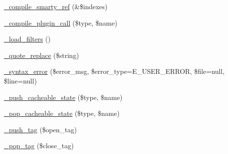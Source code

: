 \begin{DoxyCompactItemize}
\item 
\mbox{\hyperlink{class_smarty___compiler_ab320c43ef5206f5be26190264ee8e87d}{\+\_\+compile\+\_\+smarty\+\_\+ref}} (\&\$indexes)
\item 
\mbox{\hyperlink{class_smarty___compiler_ac9e7526111cdf46d56d1515813a26e09}{\+\_\+compile\+\_\+plugin\+\_\+call}} (\$type, \$name)
\item 
\mbox{\hyperlink{class_smarty___compiler_a78b7b3c8ce574b2dcfcbd48070061740}{\+\_\+load\+\_\+filters}} ()
\item 
\mbox{\hyperlink{class_smarty___compiler_af44c0aadf5d97fe891cc281c1de622e5}{\+\_\+quote\+\_\+replace}} (\$string)
\item 
\mbox{\hyperlink{class_smarty___compiler_a9cf75cd6abe553dd33660de24527d0aa}{\+\_\+syntax\+\_\+error}} (\$error\+\_\+msg, \$error\+\_\+type=E\+\_\+\+U\+S\+E\+R\+\_\+\+E\+R\+R\+OR, \$file=null, \$line=null)
\item 
\mbox{\hyperlink{class_smarty___compiler_a11b685691a5b572278f01ff01c31afbe}{\+\_\+push\+\_\+cacheable\+\_\+state}} (\$type, \$name)
\item 
\mbox{\hyperlink{class_smarty___compiler_a485abbea43510914e066dcc2f0ebbfc0}{\+\_\+pop\+\_\+cacheable\+\_\+state}} (\$type, \$name)
\item 
\mbox{\hyperlink{class_smarty___compiler_a04fd5536a55810e196b1da7b119eb5e6}{\+\_\+push\+\_\+tag}} (\$open\+\_\+tag)
\item 
\mbox{\hyperlink{class_smarty___compiler_a4236d065e7b94b1189e57274249eb6db}{\+\_\+pop\+\_\+tag}} (\$close\+\_\+tag)
\end{DoxyCompactItemize}
